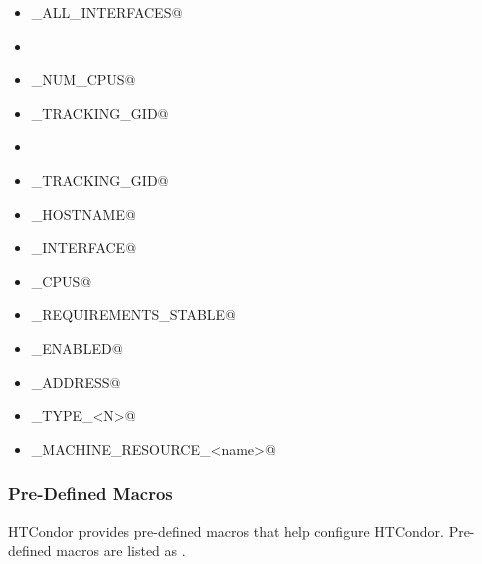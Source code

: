 \begin{itemize}
  \item \verb@BIND_ALL_INTERFACES@
  \item \verb@FetchWorkDelay@
  \item \verb@MAX_NUM_CPUS@
  \item \verb@MAX_TRACKING_GID@
  \item \verb@MEMORY@
  \item \verb@MIN_TRACKING_GID@
  \item \verb@NETWORK_HOSTNAME@
  \item \verb@NETWORK_INTERFACE@
  \item \verb@NUM_CPUS@
  \item \verb@PREEMPTION_REQUIREMENTS_STABLE@
  \item \verb@PRIVSEP_ENABLED@
  \item \verb@PROCD_ADDRESS@
  \item \verb@SLOT_TYPE_<N>@
  \item \verb@OFFLINE_MACHINE_RESOURCE_<name>@
\end{itemize}

\subsubsection{\label{sec:Pre-Defined-Macros}Pre-Defined Macros}

HTCondor provides pre-defined macros that help configure HTCondor.
Pre-defined macros are listed as .

